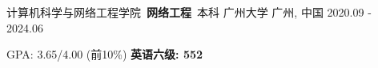 

\begin{cventries}

  \cventry
    {计算机科学与网络工程学院\ \textbf{网络工程}\ 本科} %
    {广州大学} %
    {广州, 中国} %
    {2020.09 - 2024.06} %
    {
      \begin{cvitems} %
        \item {GPA: 3.65/4.00 (前10\%) \hspace{1mm} \textbf{英语六级: 552}}
      \end{cvitems}
    }

\end{cventries}
